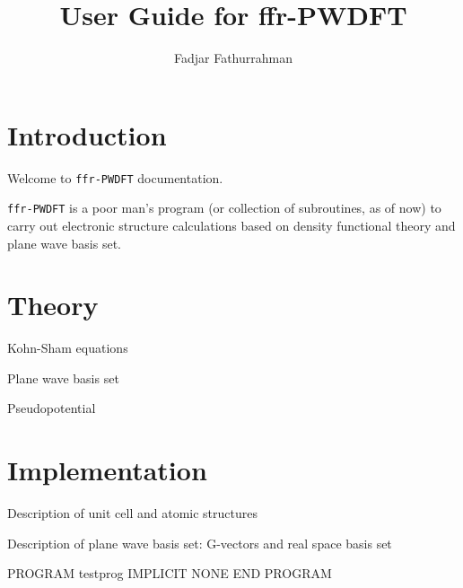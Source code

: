 \documentclass[a4paper,11pt]{extarticle}
\begin{document}
\title{User Guide for {\ttfamily ffr-PWDFT}}
\author{Fadjar Fathurrahman}
\date{}
\maketitle

\tableofcontents

\section{Introduction}

Welcome to {\tt ffr-PWDFT} documentation.

{\tt ffr-PWDFT} is a poor man's program (or collection of subroutines, as of now)
to carry out electronic structure calculations based on density functional theory
and plane wave basis set.

\section{Theory}

Kohn-Sham equations

Plane wave basis set

Pseudopotential

\section{Implementation}

Description of unit cell and atomic structures

Description of plane wave basis set: G-vectors and real space basis set

\begin{fortrancode}
PROGRAM testprog
  IMPLICIT NONE
END PROGRAM
\end{fortrancode}
\end{document}
